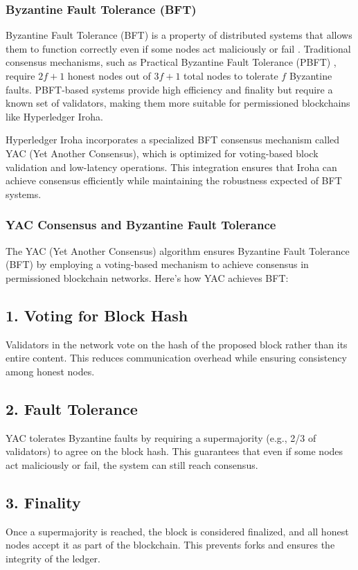 \documentclass{article}
\begin{document}
\subsubsection{Byzantine Fault Tolerance (BFT)}

Byzantine Fault Tolerance (BFT) is a property of distributed systems that allows them to function correctly even if some nodes act maliciously or fail \cite{lamport1982byzantine}. Traditional consensus mechanisms, such as Practical Byzantine Fault Tolerance (PBFT) \cite{castro1999practical}, require \(2f+1\) honest nodes out of \(3f+1\) total nodes to tolerate \(f\) Byzantine faults. PBFT-based systems provide high efficiency and finality but require a known set of validators, making them more suitable for permissioned blockchains like Hyperledger Iroha.

Hyperledger Iroha incorporates a specialized BFT consensus mechanism called YAC (Yet Another Consensus), which is optimized for voting-based block validation and low-latency operations. This integration ensures that Iroha can achieve consensus efficiently while maintaining the robustness expected of BFT systems.

\subsubsection{YAC Consensus and Byzantine Fault Tolerance}
The YAC (Yet Another Consensus) algorithm ensures Byzantine Fault Tolerance (BFT) \cite{yac2018bft} by employing a voting-based mechanism to achieve consensus in permissioned blockchain networks. Here’s how YAC achieves BFT:

\subsection*{1. Voting for Block Hash}
Validators in the network vote on the hash of the proposed block rather than its entire content. This reduces communication overhead while ensuring consistency among honest nodes.

\subsection*{2. Fault Tolerance}
YAC tolerates Byzantine faults by requiring a supermajority (e.g., 2/3 of validators) to agree on the block hash. This guarantees that even if some nodes act maliciously or fail, the system can still reach consensus.

\subsection*{3. Finality}
Once a supermajority is reached, the block is considered finalized, and all honest nodes accept it as part of the blockchain. This prevents forks and ensures the integrity of the ledger.
\end{document}

